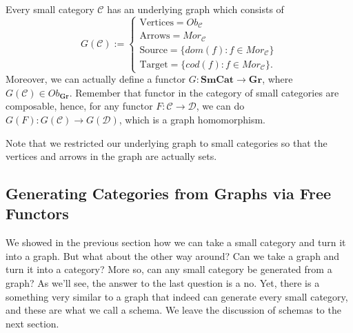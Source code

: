 \begin{definition}
  Every small category $\mathcal C$ has an underlying graph which consists of
  \begin{displaymath}
  G(\mathcal C) := \begin{cases}
    \text{Vertices} = Ob_\mathcal C \\
    \text{Arrows} = Mor_\mathcal C \\
    \text{Source} = \{dom(f)  : f \in Mor_\mathcal C\} \\
    \text{Target} = \{cod(f)  : f \in Mor_\mathcal C\}.
    \end{cases}
  \end{displaymath}
  Moreover, we can actually define a functor $G : \mathbf{SmCat} \to \mathbf{Gr}$,
  where $G(\mathcal C) \in Ob_{\mathbf{Gr}}$. Remember that functor in the 
  category of small categories are composable, hence, for any 
  functor $F:\mathcal C \to \mathcal D$, we can do
  $G(F):G(\mathcal C) \to G(\mathcal D)$, which is a graph homomorphism.
\end{definition}

Note that we restricted our underlying graph to small categories so that
the vertices and arrows in the graph are actually sets.

\subsection{Generating Categories from Graphs via Free Functors}

We showed in the previous section how we can take a small category and turn it
into a graph. But what about the other way around? Can we take a graph and turn it
into a category? More so, can any small category be generated from a graph?
As we'll see, the answer to the last question is a no. Yet, there is a
something very similar to a graph that indeed can generate every small category,
and these are what we call a schema. We leave the discussion of schemas to the next section.

